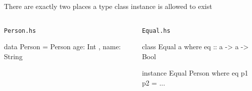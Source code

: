 \documentclass[usenames,dvipsnames,svgnames,table,aspectratio=169,mathserif]{beamer}
\newcommand{\nl}{\vspace{\baselineskip}}
\begin{document}
\begin{frame}[fragile]

There are exactly two places a type class instance is allowed to exist

\nl

\begin{columns}
\begin{column}[T]{0.49\textwidth}
\begin{block}{\tt Person.hs}
\begin{haskellcode}
data Person = Person
  { age: Int
  , name: String }
\end{haskellcode}
\end{block}
\end{column}
\begin{column}{0.02\textwidth}
\end{column}
\begin{column}[T]{0.49\textwidth}
\begin{block}{\tt Equal.hs}
\begin{haskellcode}
class Equal a where
  eq :: a -> a -> Bool


instance Equal Person where
  eq p1 p2 = ...
\end{haskellcode}
\end{block}
\end{column}
\end{columns}

\end{frame}
\end{document}
